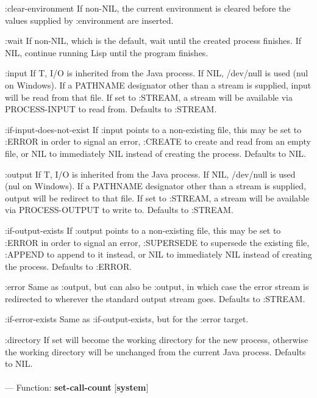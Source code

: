 \begin{adjustwidth}{5em}{5em}
:clear-environment
    If non-NIL, the current environment is cleared before the
    values supplied by :environment are inserted.

:wait
    If non-NIL, which is the default, wait until the created process
    finishes. If NIL, continue running Lisp until the program
    finishes.

:input
    If T, I/O is inherited from the Java process. If NIL, /dev/null is used
    (nul on Windows). If a PATHNAME designator other than a stream is
    supplied, input will be read from that file. If set to :STREAM, a stream
    will be available via PROCESS-INPUT to read from. Defaults to :STREAM.

:if-input-does-not-exist
    If :input points to a non-existing file, this may be set to :ERROR in
    order to signal an error, :CREATE to create and read from an empty file,
    or NIL to immediately NIL instead of creating the process.
    Defaults to NIL.

:output
    If T, I/O is inherited from the Java process. If NIL, /dev/null is used
    (nul on Windows). If a PATHNAME designator other than a stream is
    supplied, output will be redirect to that file. If set to :STREAM, a
    stream will be available via PROCESS-OUTPUT to write to.
    Defaults to :STREAM.

:if-output-exists
    If :output points to a non-existing file, this may be set to :ERROR in
    order to signal an error, :SUPERSEDE to supersede the existing file,
    :APPEND to append to it instead, or NIL to immediately NIL instead of
    creating the process. Defaults to :ERROR.

:error
    Same as :output, but can also be :output, in which case the error stream
    is redirected to wherever the standard output stream goes.
    Defaults to :STREAM.

:if-error-exists
    Same as :if-output-exists, but for the :error target.

:directory
    If set will become the working directory for the new process, otherwise
    the working directory will be unchanged from the current Java process.
    Defaults to NIL.

\end{adjustwidth}

\paragraph{}
\label{SYSTEM:SET-CALL-COUNT}
--- Function: \textbf{set-call-count} [\textbf{system}] \textit{}

